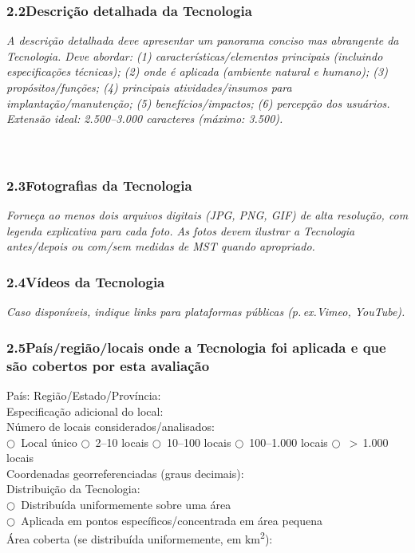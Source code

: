 \subsubsection*{2.2\quad Descrição detalhada da Tecnologia}
\textit{A descrição detalhada deve apresentar um panorama conciso mas abrangente da Tecnologia. Deve abordar: (1) características/elementos principais (incluindo especificações técnicas); (2) onde é aplicada (ambiente natural e humano); (3) propósitos/funções; (4) principais atividades/insumos para implantação/manutenção; (5) benefícios/impactos; (6) percepção dos usuários. Extensão ideal: 2.500--3.000 caracteres (máximo: 3.500).}\\[4pt]
\dotfill\\[2pt]\dotfill\\[2pt]\dotfill

\subsubsection*{2.3\quad Fotografias da Tecnologia}
\textit{Forneça ao menos dois arquivos digitais (JPG, PNG, GIF) de alta resolução, com legenda explicativa para cada foto. As fotos devem ilustrar a Tecnologia antes/depois ou com/sem medidas de MST quando apropriado.}

\subsubsection*{2.4\quad Vídeos da Tecnologia}
\textit{Caso disponíveis, indique links para plataformas públicas (p.\,ex.\@ Vimeo, YouTube).}

\subsubsection*{2.5\quad País/região/locais onde a Tecnologia foi aplicada e que são cobertos por esta avaliação}

País: \dotfill\quad Região/Estado/Província: \dotfill\\
Especificação adicional do local: \dotfill\\[4pt]
Número de locais considerados/analisados:\\
$\bigcirc$~Local único \quad $\bigcirc$~2--10 locais \quad $\bigcirc$~10--100 locais \quad $\bigcirc$~100--1.000 locais \quad $\bigcirc$~$>$\,1.000 locais\\[4pt]
Coordenadas georreferenciadas (graus decimais): \dotfill\\[4pt]
Distribuição da Tecnologia:\\
$\bigcirc$~Distribuída uniformemente sobre uma área\\
$\bigcirc$~Aplicada em pontos específicos/concentrada em área pequena\\
Área coberta (se distribuída uniformemente, em km\textsuperscript{2}): \dotfill

